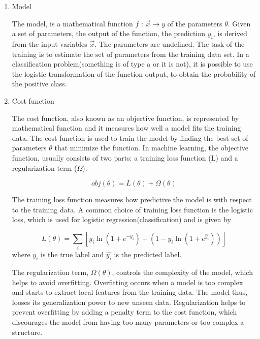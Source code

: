 \begin{enumerate}
\item Model
\label{sec:org9267753}

The model, is a mathematical function \(f\text{ : } \vec{x} \rightarrow y\) of the parameters \(\theta\). Given a set of parameters, the output of the function, the prediction \(y_{i}\), is derived from the input variables \(\vec{x}\).
The parameters are undefined. The task of the training is to estimate the set of parameters from the training data set.
In a classification problem(something is of type a or it is not), it is possible to use the logistic transformation of the function output, to obtain the probability of the positive class.

\item Cost function
\label{sec:org4bc322f}

The cost function, also known as an objective function, is represented by mathematical function and it measures how well a model fits the training data. The cost function is used to train the model by finding the best set of parameters \(\theta\) that minimize the function.
In machine learning, the objective function, usually consists of two parts: a training loss function (L) and a regularization term (\(\Omega\)).

\begin{equation}
obj(\theta) = L(\theta) + \Omega(\theta)
\end{equation}

The training loss function measures how predictive the model is with respect to the training data. A common choice of training loss function is the logistic loss, which is used for logistic regression(classification) and is given by

\begin{equation}
L(\theta) = \sum_{i}[ y_{i}\ln(1+e^{-\hat{y_{i}}})+(1-y_{i}\ln(1+e^{\hat{y}_{i}}))]
\end{equation}
where \(y_{i}\) is the true label and \(\hat{y_{i}}\) is the predicted label.

The regularization term, \(\Omega(\theta)\), controls the complexity of the model, which helps to avoid overfitting. Overfitting occurs when a model is too complex and starts to extract local features from the training data. The model thus, looses its generalization power to new unseen data. Regularization helps to prevent overfitting by adding a penalty term to the cost function, which discourages the model from having too many parameters or too complex a structure.


\end{enumerate}
